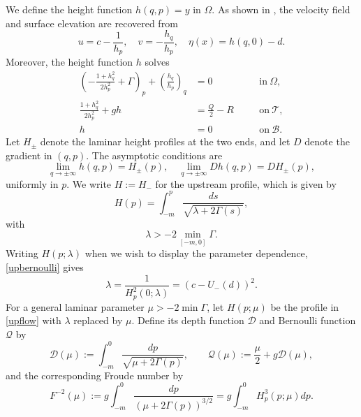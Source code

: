 \documentclass[12pt,letterpaper]{amsart}
\numberwithin{equation}{section}
\begin{document}
	We define the height function $h(q,p)=y$ in $\Omega$. {As shown in} \cite{constantincpam04,constantinstraussarma11,warma}, {the velocity field and surface elevation are recovered from}
	\begin{equation*}
		u=c-\frac{1}{h_p},\quad v=-\frac{h_q}{h_p},\quad \eta(x)=h(q,0)-d.
	\end{equation*}
	Moreover, the height function $h$ solves
	\begin{subequations}\label{heighteq}
		\begin{align}
		\left(-\frac{1+h_q^2}{2h_p^2}+\Gamma\right)_p+\left(\frac{h_q}{h_p}\right)_q& =0\quad&&\mathrm{in~}\Omega,\label{heighteq1}\\
		\frac{1+h_q^2}{2h_p^2}+gh&=\frac{Q}{2}-R\quad&&\mathrm{on~}\mathcal T,\label{heighteq2}\\
		h&=0&&\mathrm{on~}\mathcal B.
		\end{align}
	\end{subequations}
	{Let $H_\pm$ denote the laminar height profiles at the two ends, and let $D$ denote the gradient in $(q,p)$. The asymptotic conditions are}
	\begin{equation*}
		\lim_{q\to\pm\infty}h(q,p)=H_{\pm}(p),\quad\lim_{q\to\pm\infty}Dh(q,p)=DH_{\pm}(p),
	\end{equation*}
	{uniformly in $p$. We write $H:=H_-$ for the upstream profile, which is given by}
	\begin{equation}\label{upflow}
		H(p)=\int_{-m}^p\frac{ds}{\sqrt{\lambda+2\Gamma(s)}},
	\end{equation}
	with\begin{equation*}
		\lambda>-2\min_{[-m,0]}\Gamma.
	\end{equation*}	
	{Writing $H(p;\lambda)$ when we wish to display the parameter dependence, \eqref{upbernoulli} gives}
	\begin{equation*}
	\lambda=\frac{1}{H_p^2(0;\lambda)}={(c-U_-(d))^2}.
\end{equation*}
	{For a general laminar parameter $\mu>-2\min\Gamma$, let $H(p;\mu)$ be the profile in \eqref{upflow} with $\lambda$ replaced by $\mu$. Define its depth function $\mathcal D$ and Bernoulli function $\mathcal Q$ by}
	\begin{equation*}
	\mathcal{D}(\mu):=\int_{-m}^0\frac{d p}{\sqrt{\mu+2\Gamma(p)}},
		\qquad
		\mathcal{Q}(\mu):=\frac\mu2+g\mathcal D(\mu),
	\end{equation*}
	{and the corresponding Froude number by}
	\begin{equation}\label{eq:F-mu}
		F^{-2}(\mu):=g\int_{-m}^0\frac{d p}{(\mu+2\Gamma(p))^{3/2}}=g\int_{-m}^0 H_p^3(p;\mu)dp.
	\end{equation}
\end{document}
